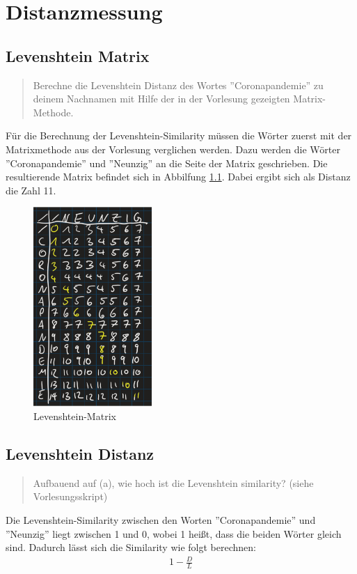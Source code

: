 \chapter{Distanzmessung}

\section{Levenshtein Matrix}
\begin{quote}
    Berechne die Levenshtein Distanz des Wortes ''Coronapandemie'' zu deinem Nachnamen mit Hilfe der in der Vorlesung gezeigten Matrix-Methode.
\end{quote}
Für die Berechnung der Levenshtein-Similarity müssen die Wörter zuerst mit der Matrixmethode aus der Vorlesung verglichen werden. Dazu werden die Wörter ''Coronapandemie'' und ''Neunzig'' an die Seite der Matrix geschrieben. Die resultierende Matrix befindet sich in Abbilfung \ref{fig:matrix1}. Dabei ergibt sich als Distanz die Zahl 11.

\begin{figure}[ht]
	\centering
	\includegraphics[width=0.4\textwidth]{Bilder/MatrixNormal.png} 
	\caption{Levenshtein-Matrix}
	\label{fig:matrix1}
\end{figure}

\section{Levenshtein Distanz}
\begin{quote}
    Aufbauend auf (a), wie hoch ist die Levenshtein similarity? (siehe Vorlesungsskript)
\end{quote}
Die Levenshtein-Similarity zwischen den Worten ''Coronapandemie'' und ''Neunzig'' liegt zwischen 1 und 0, wobei 1 heißt, dass die beiden Wörter gleich sind. Dadurch lässt sich die Similarity wie folgt berechnen: 
\begin{align*}
    1 - \frac{D}{L}
\end{align*}

